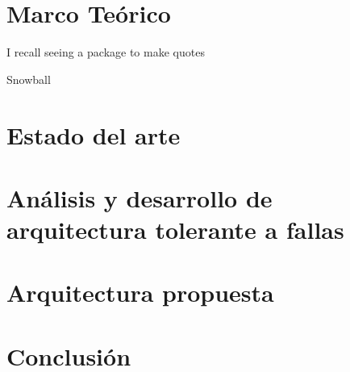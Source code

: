 \documentclass[11pt, a4paper, twoside]{report}
\begin{document}
\chapter{Marco Teórico}\label{chap:marco_teorico}
\epigraph{I recall seeing a package to make quotes}{Snowball}

\chapter{Estado del arte}\label{chap:estado_del_arte}

\chapter{Análisis y desarrollo de arquitectura tolerante a fallas}

\chapter{Arquitectura propuesta}

%
\chapter{Conclusión}

%

%
%
%
%
%


\newpage
\nocite{*}

%


\appendix



\begin{comment} 
\newpage
$\ $
\thispagestyle{empty} %
\newpage
$\ $
\thispagestyle{empty}
\end{comment}
\end{document}
